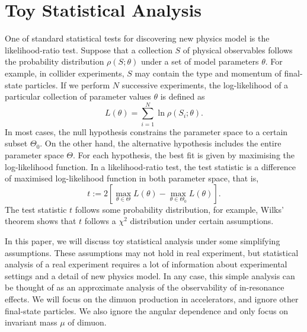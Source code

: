 \documentclass[11pt]{article}
\theoremstyle{definition}
\theoremstyle{remark}
\begin{document}
	\section{Toy Statistical Analysis}
	One of standard statistical tests for discovering new physics model is the likelihood-ratio test.
	Suppose that a collection $S$ of physical observables follows the probability distribution $\rho(S;\theta)$ under a set of model parameters $\theta$.
	For example, in collider experiments, $S$ may contain the type and momentum of final-state particles.
	If we perform $N$ successive experiments, the log-likelihood of a particular collection of parameter values $\theta$ is defined as
	\[L(\theta)=\sum_{i=1}^{N}\ln\rho(S_{i};\theta).\]
	In most cases, the null hypothesis constrains the parameter space to a certain subset $\Theta_{0}$.
	On the other hand, the alternative hypothesis includes the entire parameter space $\Theta$.
	For each hypothesis, the best fit is given by maximising the log-likelihood function.
	In a likelihood-ratio test, the test statistic is a difference of maximised log-likelihood function in both parameter space, that is,
	\[t:=2\left[\max_{\theta\in\Theta}L(\theta)-\max_{\theta\in\Theta_{0}}L(\theta)\right].\]
	The test statistic $t$ follows some probability distribution, for example, Wilks' theorem shows that $t$ follows a $\chi^{2}$ distribution under certain assumptions.
	
	In this paper, we will discuss toy statistical analysis under some simplifying assumptions.
	These assumptions may not hold in real experiment, but statistical analysis of a real experiment requires a lot of information about experimental settings and a detail of new physics model.
	In any case, this simple analysis can be thought of as an approximate analysis of the observability of in-resonance effects.
	We will focus on the dimuon production in accelerators, and ignore other final-state particles.
	We also ignore the angular dependence and only focus on invariant mass $\mu$ of dimuon.
	
\end{document}
